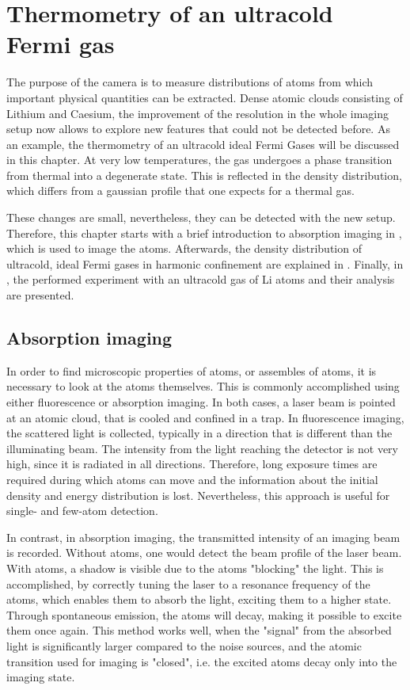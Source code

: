 \chapter{Thermometry of an ultracold Fermi gas}
\label{ch:idealfermigas}
The purpose of the camera is to measure distributions of atoms from which important physical quantities can be extracted. Dense atomic clouds consisting of Lithium and Caesium, the improvement of the resolution in the whole imaging setup now allows to explore new features that could not be detected before. As an example, the thermometry of an ultracold ideal Fermi Gases will be discussed in this chapter. At very low temperatures, the gas undergoes a phase transition from thermal into a degenerate state. This is reflected in the density distribution, which differs from a gaussian profile that one expects for a thermal gas.

These changes are small, nevertheless, they can be detected with the new setup. Therefore, this chapter starts with a brief introduction to absorption imaging in , which is used to image the atoms. Afterwards, the density distribution of ultracold, ideal Fermi gases in harmonic confinement are explained in .
Finally, in , the performed experiment with an ultracold gas of Li atoms and their analysis are presented.

\section{Absorption imaging}
\label{sec:absim}
In order to find microscopic properties of atoms, or assembles of atoms, it is necessary to look at the atoms themselves. This is commonly accomplished using either fluorescence or absorption imaging\cite{Murmann2011}. In both cases, a laser beam is pointed at an atomic cloud, that is cooled and confined in a trap. In fluorescence imaging, the scattered light is collected, typically in a direction that is different than the illuminating beam.
The intensity from the light reaching the detector is not very high, since it is radiated in all directions. Therefore, long exposure times are required during which atoms can move and the information about the initial density and energy distribution is lost. Nevertheless, this approach is useful for single- and few-atom detection.

In contrast, in absorption imaging\cite{helmrich2013}, the transmitted intensity of an imaging beam is recorded. Without atoms, one would detect the beam profile of the laser beam. With atoms, a shadow is visible due to the atoms "blocking" the light. This is accomplished, by correctly tuning the laser to a resonance frequency of the atoms, which enables them to absorb the light, exciting them to a higher state. Through spontaneous emission, the atoms will decay, making it possible to excite them once again. This method works well, when the "signal" from the absorbed light is significantly larger compared to the noise sources, and the atomic transition used for imaging is "closed", i.e. the excited atoms decay only into the imaging state.

